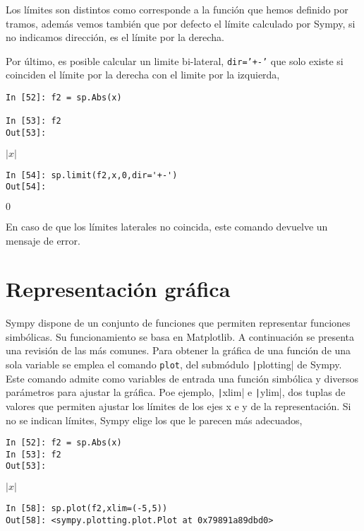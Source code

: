 Los límites son distintos como corresponde a la función que hemos definido por tramos, además vemos también que por defecto el límite calculado por Sympy, si no indicamos dirección, es el límite por la derecha.

Por último, es posible calcular un limite bi-lateral, \texttt{dir='+-'} que solo existe si coinciden el límite por la derecha con el limite por la izquierda,

\begin{center}
	\begin{minipage}{.6\textwidth}
		\begin{verbatim}
In [52]: f2 = sp.Abs(x)

In [53]: f2
Out[53]: 		\end{verbatim}
		$|x|$
		\begin{verbatim}
In [54]: sp.limit(f2,x,0,dir='+-')
Out[54]: 
		\end{verbatim}
		$0$
		
	\end{minipage}
\end{center}

En caso de que los límites laterales no coincida, este comando devuelve un mensaje de error.



\section{Representación gráfica}
Sympy dispone de un conjunto de funciones que permiten representar funciones simbólicas. Su funcionamiento se basa en Matplotlib. A continuación se presenta una revisión de las más comunes.
Para obtener la gráfica de una función de una sola variable se emplea el comando \texttt{plot}, del submódulo \texttt|plotting| de Sympy. Este comando admite como variables de entrada una función simbólica y diversos parámetros para ajustar la gráfica. Poe ejemplo, \texttt|xlim| e \texttt|ylim|, dos tuplas de valores que permiten ajustar los límites de los ejes x e y de la representación. Si no se indican límites, Sympy elige los que le parecen más adecuados,

\begin{center}
	\begin{minipage}{.6\textwidth}
		\begin{verbatim}
In [52]: f2 = sp.Abs(x)
In [53]: f2
Out[53]:
 		\end{verbatim}
		$|x|$
		\begin{verbatim}
In [58]: sp.plot(f2,xlim=(-5,5))
Out[58]: <sympy.plotting.plot.Plot at 0x79891a89dbd0>
		\end{verbatim}
	\end{minipage}
\end{center}
  
